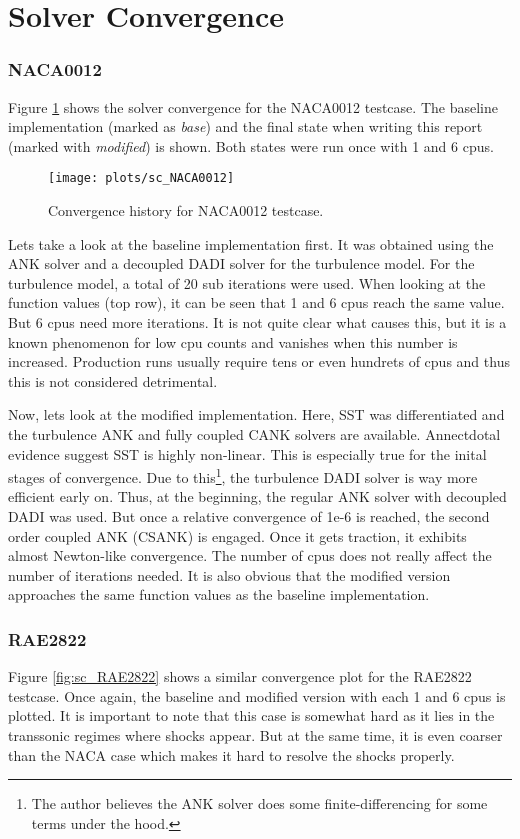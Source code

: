 \section{Solver Convergence}
\subsubsection{NACA0012}
Figure \ref{fig:sc_NACA0012} shows the solver convergence for the NACA0012
testcase. The baseline implementation (marked as \textit{base}) and the final
state when writing this report (marked with \textit{modified}) is shown. Both
states were run once with 1 and 6 cpus.

\begin{figure}[H] \centering
    \texttt{[image: plots/sc\_NACA0012]}
    \caption{Convergence history for NACA0012 testcase.}
    \label{fig:sc_NACA0012}
\end{figure}

\noindent Lets take a look at the baseline implementation first. It was
obtained using the ANK solver and a decoupled DADI solver for the turbulence
model. For the turbulence model, a total of 20 sub iterations were used. When
looking at the function values (top row), it can be seen that 1 and 6 cpus
reach the same value. But 6 cpus need more iterations. It is not quite clear
what causes this, but it is a known phenomenon for low cpu counts and vanishes
when this number is increased. Production runs usually require tens or even
hundrets of cpus and thus this is not considered detrimental.


Now, lets look at the modified implementation. Here, SST was differentiated and
the turbulence ANK and fully coupled CANK solvers are available. Annectdotal
evidence suggest SST is highly non-linear. This is especially true for the
inital stages of convergence. Due to this\footnote{The author believes the ANK
solver does some finite-differencing for some terms under the hood.}, the
turbulence DADI solver is way more efficient early on. Thus, at the beginning,
the regular ANK solver with decoupled DADI was used. But once a relative
convergence of 1e-6 is reached, the second order coupled ANK (CSANK) is
engaged. Once it gets traction, it exhibits almost Newton-like convergence. The
number of cpus does not really affect the number of iterations needed. It is
also obvious that the modified version approaches the same function values as
the baseline implementation. 




\subsubsection{RAE2822}
Figure \ref{fig:sc_RAE2822} shows a similar convergence plot for the RAE2822
testcase. Once again, the baseline and modified version with each 1 and 6 cpus
is plotted. It is important to note that this case is somewhat hard as it lies
in the transsonic regimes where shocks appear. But at the same time, it is even
coarser than the NACA case which makes it hard to resolve the shocks properly.

